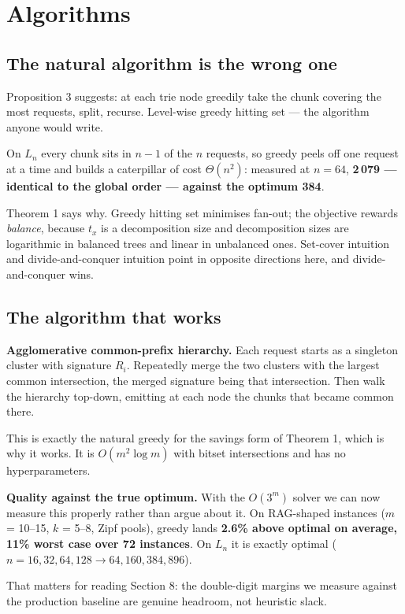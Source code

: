 \documentclass[11pt]{article}
\theoremstyle{plain}
\begin{document}
\section{Algorithms}

\subsection{The natural algorithm is the wrong one}

Proposition 3 suggests: at each trie node greedily take the chunk covering the most requests, split, recurse. Level-wise greedy hitting set --- the algorithm anyone would write.

On $L_n$ every chunk sits in $n-1$ of the $n$ requests, so greedy peels off one request at a time and builds a caterpillar of cost $\Theta(n^2)$: measured at $n = 64$, \textbf{2\,079 --- identical to the global order --- against the optimum 384}.

Theorem 1 says why. Greedy hitting set minimises fan-out; the objective rewards \emph{balance}, because $t_x$ is a decomposition size and decomposition sizes are logarithmic in balanced trees and linear in unbalanced ones. Set-cover intuition and divide-and-conquer intuition point in opposite directions here, and divide-and-conquer wins.

\subsection{The algorithm that works}

\textbf{Agglomerative common-prefix hierarchy.} Each request starts as a singleton cluster with signature $R_i$. Repeatedly merge the two clusters with the largest common intersection, the merged signature being that intersection. Then walk the hierarchy top-down, emitting at each node the chunks that became common there.

This is exactly the natural greedy for the savings form of Theorem 1, which is why it works. It is $O(m^2\log m)$ with bitset intersections and has no hyperparameters.

\textbf{Quality against the true optimum.} With the $O(3^m)$ solver we can now measure this properly rather than argue about it. On RAG-shaped instances ($m$ = 10--15, $k$ = 5--8, Zipf pools), greedy lands \textbf{2.6\% above optimal on average, 11\% worst case over 72 instances}. On $L_n$ it is exactly optimal ($n = 16, 32, 64, 128 \to 64, 160, 384, 896$).

That matters for reading Section 8: the double-digit margins we measure against the production baseline are genuine headroom, not heuristic slack.
\end{document}
